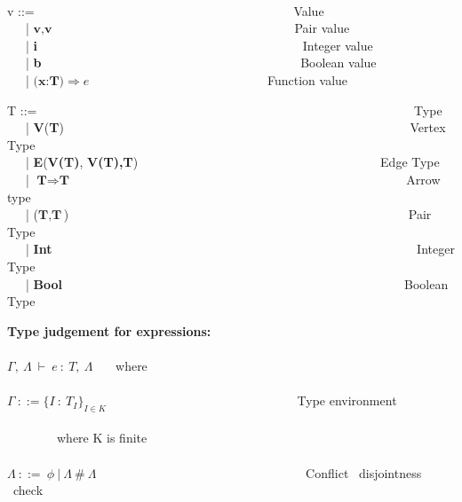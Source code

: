 \begin{frame}
{\ \\
  v ::= \ \ \ \ \ \ \ \ \ \ \ \ \ \ \ \ \ \ \ \ \ \ \ \ \ \ \ \ \ \ \ \ \ \ \ \ \ \ \ \ \ Value \\
    \ \ \ | $\textbf{v},\textbf{v}$ \ \ \ \ \ \ \ \ \ \ \ \ \ \ \ \ \ \ \ \ \ \ \ \ \ \ \ \ \ \ \ \ \ \ \ \ \ \ Pair value \\
    \ \ \ | \textbf{i} \ \ \ \ \ \ \ \ \ \ \ \ \ \ \ \  \ \ \ \ \ \ \ \ \ \ \ \ \ \ \ \ \ \ \ \ \ \ \ \ \ \ Integer value\\
    \ \ \ | \textbf{b} \ \ \ \ \ \ \ \ \ \ \ \ \ \ \ \ \ \ \ \ \ \ \ \ \ \ \ \ \ \ \ \ \ \ \ \ \ \ \ \ \ Boolean value\\
    \ \ \ | $\textbf{(x:T)} \Rightarrow e $ \ \ \ \ \ \ \ \ \ \ \ \ \ \ \ \ \ \ \ \ \ \ \ \ \ \ \ \ Function value\\
    }
\end{frame}

\begin{frame}
  \tiny{
  T ::= \ \ \ \ \ \ \ \ \ \ \ \ \ \ \ \ \ \ \ \ \ \ \ \ \ \ \ \ \ \ \ \ \ \ \ \ \ \ \ \ \ \ \ \ \ \ \ \ \ \ \ \ \ \ \ \ \ \ \ \ Type \\
    \ \ \ | \textbf{V}(\textbf{T}) \ \ \ \ \ \ \ \ \ \ \ \ \ \ \ \ \ \ \ \ \ \ \ \ \ \ \ \ \ \ \ \ \ \ \ \ \ \ \ \ \ \ \ \ \ \ \ \ \ \ \ \ \ \ \ Vertex Type \\
    \ \ \ | \textbf{E}(\textbf{V(T)}, \textbf{V(T),}\textbf{T})\ \ \ \ \ \ \ \ \ \ \ \ \ \ \ \ \ \ \ \ \ \ \ \ \ \ \ \ \ \ \ \ \ \ \ \ \ \ \  Edge Type\\
    \ \ \ | $\textbf{T} \Rightarrow \textbf{T}$ \ \ \ \ \ \ \ \ \ \  \ \ \ \ \ \ \ \ \ \ \ \ \ \ \ \ \ \ \ \ \ \ \ \ \ \ \ \ \ \  \ \ \ \ \ \ \ \ \ \ \ \ \ Arrow type \\
    \ \ \ | ($\textbf{T}, \textbf{T}$) \ \ \ \ \ \ \ \ \ \ \ \ \ \ \ \ \ \ \ \ \ \ \ \ \ \ \ \ \ \ \ \ \ \ \ \ \ \ \ \ \ \ \ \ \ \ \ \ \ \ \ \ \ \ Pair Type \\
    \ \ \ | \textbf{Int} \ \ \ \ \ \ \ \ \ \ \ \ \ \ \ \ \ \ \ \ \ \ \ \ \ \ \ \ \ \ \ \ \ \ \ \ \ \ \ \ \ \ \ \ \ \ \ \ \ \ \ \ \ \ \ \ \ \ Integer Type \\
    \ \ \ | \textbf{Bool}\ \ \ \ \ \ \ \ \ \ \ \  \ \ \ \ \ \ \ \ \ \ \ \ \ \ \ \ \ \ \ \ \ \ \ \ \ \ \ \ \ \ \ \ \ \ \ \ \ \ \ \ \ \ \  Boolean Type
}
\newline
\newline

  \tiny{
  \textbf{Type judgement for expressions:}
  \\ \ \\
  $\Gamma, \ \Lambda \ \vdash \ e \ : \ T, \ \Lambda$ \ \ \  where \\ \ \\
  $\Gamma \ ::= {\{ I \ : \ T_I \}}_{I \in K}$ \ \ \ \ \ \ \ \ \ \ \ \ \ \ \ \ \ \ \ \ \ \ \ \ \ \ \ \ \ \ Type environment\\ \ \\
  \ \ \ \ \ \ \ \ where K is finite \\
  \ \\ $\Lambda \ ::= \ \phi \ | \ \Lambda \ \# \ \Lambda$ \ \ \ \ \ \ \ \ \ \ \ \ \ \ \ \ \ \ \ \ \ \ \ \ \ \ \ \ \ \ \ \ \ Conflict \ disjointness \ check
  }
\end{frame}

